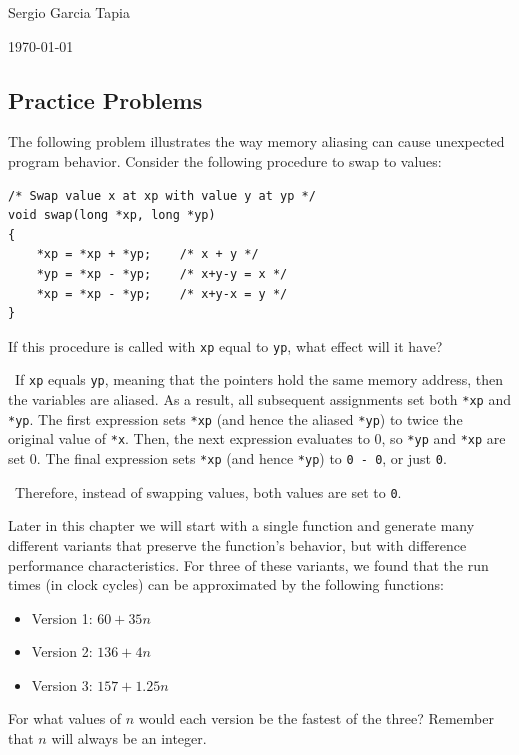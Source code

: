 \documentclass[12pt]{article}
\newenvironment{ex}[2][Exercise]{\begin{trivlist}
		\item[\hskip \labelsep {\bfseries #1}\hskip \labelsep {\bfseries #2.}]}{\end{trivlist}}
\newenvironment{sol}[1][Solution]{\begin{trivlist}
		\item[\hskip \labelsep {\bfseries #1:}]}{\end{trivlist}}
\begin{document}

\noindent Sergio Garcia Tapia \hfill

 \hfill

\noindent\today

\subsection*{Practice Problems}

\begin{ex}{5.1}
	The following problem illustrates the way memory aliasing can cause unexpected program
	behavior. Consider the following procedure to swap to values:
	\begin{lstlisting}
/* Swap value x at xp with value y at yp */
void swap(long *xp, long *yp)
{
	*xp = *xp + *yp;	/* x + y */
	*yp = *xp - *yp;	/* x+y-y = x */
	*xp = *xp - *yp;	/* x+y-x = y */
}
	\end{lstlisting}
	If this procedure is called with \texttt{xp} equal to \texttt{yp}, what effect will it
	have?
\end{ex}

\begin{sol}
	\
	If \texttt{xp} equals \texttt{yp}, meaning that the pointers hold the same memory address,
	then the variables are aliased. As a result, all subsequent assignments set both \texttt{*xp}
	and \texttt{*yp}. The first expression sets \texttt{*xp} (and hence the aliased \texttt{*yp})
	to twice the original value of \texttt{*x}. Then, the next expression evaluates to 0, so \texttt{*yp} and \texttt{*xp} are set 0. The final expression sets \texttt{*xp} (and hence \texttt{*yp}) to \texttt{0 - 0}, or just \texttt{0}.
	
	\
	Therefore, instead of swapping values, both values are set to \texttt{0}.
\end{sol}

\begin{ex}{5.2}
	Later in this chapter we will start with a single function and generate many different
	variants that preserve the function's behavior, but with difference performance
	characteristics. For three of these variants, we found that the run times (in clock
	cycles) can be approximated by the following functions:
	\begin{itemize}
		\item Version 1: $60+35n$
		\item Version 2: $136+4n$
		\item Version 3: $157+1.25n$
	\end{itemize}
	For what values of $n$ would each version be the fastest of the three? Remember
	that $n$ will always be an integer.
\end{ex}
\end{document}
